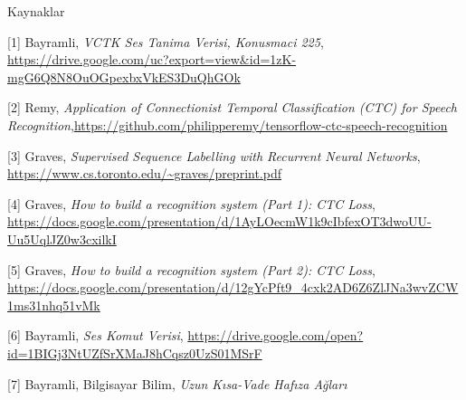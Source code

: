 \documentclass[12pt,fleqn]{article}\usepackage{../../common}
\begin{document}
\inputminted[fontsize=\footnotesize]{python}{train_ctc.py}

Kaynaklar

[1] Bayramli, {\em VCTK Ses Tanima Verisi, Konusmaci 225}, \url{https://drive.google.com/uc?export=view&id=1zK-mgG6Q8N8OuOGpexbxVkES3DuQhGOk}

[2] Remy, {\em Application of Connectionist Temporal Classification (CTC) for Speech Recognition},\url{https://github.com/philipperemy/tensorflow-ctc-speech-recognition}

[3] Graves, {\em Supervised Sequence Labelling with Recurrent Neural Networks}, \url{https://www.cs.toronto.edu/~graves/preprint.pdf}

[4] Graves, {\em How to build a recognition system (Part 1): CTC Loss}, \url{https://docs.google.com/presentation/d/1AyLOecmW1k9cIbfexOT3dwoUU-Uu5UqlJZ0w3cxilkI}

[5] Graves, {\em How to build a recognition system (Part 2): CTC Loss}, \url{https://docs.google.com/presentation/d/12gYcPft9_4cxk2AD6Z6ZlJNa3wvZCW1ms31nhq51vMk}

[6] Bayramli, {\em Ses Komut Verisi}, \url{https://drive.google.com/open?id=1BIGj3NtUZfSrXMaJ8hCqsz0UzS01MSrF}

[7] Bayramli, Bilgisayar Bilim, {\em Uzun Kısa-Vade  Hafıza Ağları}
\end{document}
